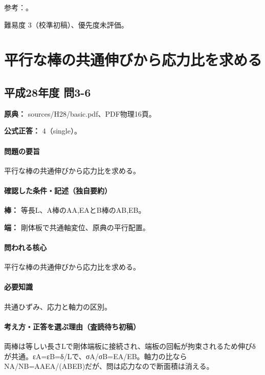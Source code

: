 \par 参考：\cite{analysis57_resistors}。

\par 難易度 3（校準初稿）、優先度未評価。

\section{平行な棒の共通伸びから応力比を求める}

\subsection{平成28年度 問3-6}
\label{q:h28-reg-basic-3-6}

\noindent\textbf{原典：} sources/H28/basic.pdf、PDF物理16頁。

\textbf{公式正答：} 4（single）。

\paragraph{問題の要旨} 平行な棒の共通伸びから応力比を求める。

\paragraph{確認した条件・記述（独自要約）}\mbox{}\par

\noindent\textbf{棒：} 等長L、A棒のAA,EAとB棒のAB,EB。\par

\noindent\textbf{端：} 剛体板で共通軸変位、原典の平行配置。\par

\paragraph{問われる核心} 平行な棒の共通伸びから応力比を求める。

\paragraph{必要知識} 共通ひずみ、応力と軸力の区別。

\paragraph{考え方・正答を選ぶ理由（査読待ち初稿）} 両棒は等しい長さLで剛体端板に接続され、端板の回転が拘束されるため伸びδが共通。εA=εB=δ/Lで、σA/σB=\allowbreak{}EA/EB。軸力の比ならNA/NB=\allowbreak{}AAEA/(ABEB)だが、問は応力なので断面積は消える。

